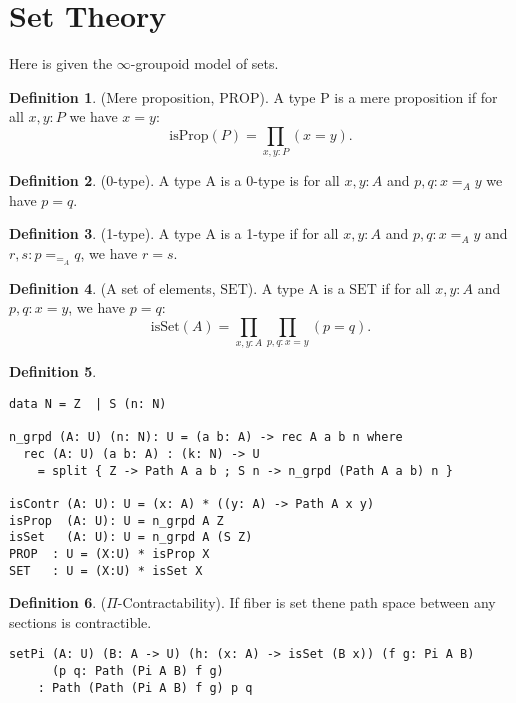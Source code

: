 \documentclass{article}
\theoremstyle{definition}
\newtheorem{definition}{Definition}
\begin{document}
\section{Set Theory}

Here is given the $\infty$-groupoid model of sets.

\begin{definition} (Mere proposition, $\mathrm{PROP}$).
A type P is a mere proposition if for all $x,y: P$ we have $x=y$:
$$
    \mathrm{isProp}(P) = \prod_{x,y:P}(x=y).
$$
\end{definition}

\begin{definition} (0-type).
A type A is a 0-type is for all $x,y: A$ and $p,q: x =_A y$ we have $p = q$.
\end{definition}

\begin{definition} (1-type).
A type A is a 1-type if for all $x,y: A$ and $p,q: x =_A y$ and $r,s:p =_{=_A} q$, we have $r = s$.
\end{definition}

\begin{definition} (A set of elements, $\mathrm{SET}$).
A type A is a $\mathrm{SET}$ if for all $x,y: A$ and $p,q: x = y$, we have $p = q$:
$$
    \mathrm{isSet}(A) = \prod_{x,y:A}\prod_{p,q:x=y}(p=q).
$$
\end{definition}

\begin{definition}
\begin{lstlisting}
data N = Z  | S (n: N)

n_grpd (A: U) (n: N): U = (a b: A) -> rec A a b n where
  rec (A: U) (a b: A) : (k: N) -> U
    = split { Z -> Path A a b ; S n -> n_grpd (Path A a b) n }

isContr (A: U): U = (x: A) * ((y: A) -> Path A x y)
isProp  (A: U): U = n_grpd A Z
isSet   (A: U): U = n_grpd A (S Z)
PROP  : U = (X:U) * isProp X
SET   : U = (X:U) * isSet X
\end{lstlisting}
\end{definition}

\begin{definition} ($\Pi$-Contractability).
If fiber is set thene path space between any sections is contractible.
\begin{lstlisting}
setPi (A: U) (B: A -> U) (h: (x: A) -> isSet (B x)) (f g: Pi A B)
      (p q: Path (Pi A B) f g)
    : Path (Path (Pi A B) f g) p q
\end{lstlisting}
\end{definition}
\end{document}
